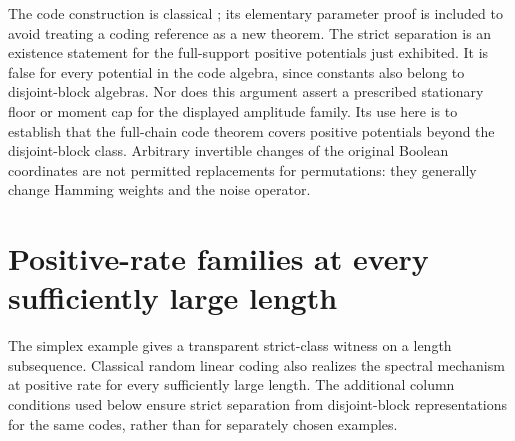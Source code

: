 \documentclass[11pt]{article}
\begin{document}
The code construction is classical \cite{wootters}; its elementary parameter proof is included to avoid treating a coding reference as a new theorem. The strict separation is an existence statement for the full-support positive potentials just exhibited. It is false for every potential in the code algebra, since constants also belong to disjoint-block algebras. Nor does this argument assert a prescribed stationary floor or moment cap for the displayed amplitude family. Its use here is to establish that the full-chain code theorem covers positive potentials beyond the disjoint-block class. Arbitrary invertible changes of the original Boolean coordinates are not permitted replacements for permutations: they generally change Hamming weights and the noise operator.

\section{Positive-rate families at every sufficiently large length}
The simplex example gives a transparent strict-class witness on a length subsequence. Classical random linear coding also realizes the spectral mechanism at positive rate for every sufficiently large length. The additional column conditions used below ensure strict separation from disjoint-block representations for the same codes, rather than for separately chosen examples.
\end{document}
